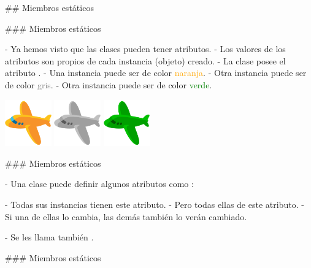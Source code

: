 ## Miembros estáticos

### Miembros estáticos


- Ya hemos visto que las clases pueden tener atributos.
    - Los valores de los atributos son propios de cada instancia (objeto) creado.
        - La clase  posee el atributo .
        - Una instancia puede ser de color \textcolor{orange}{naranja}.
        - Otra instancia puede ser de color \textcolor{gray}{gris}.
        - Otra instancia puede ser de color \textcolor{green}{verde}.

\vfill

\columnsbegin
{}
\centering\includegraphics[width=20mm]{icons/92-emoji_android_airplane.png}
\centering\includegraphics[width=20mm]{icons/92-emoji_android_airplane_gray.png}
\centering\includegraphics[width=20mm]{icons/92-emoji_android_airplane_green.png}
\columnsend

### Miembros estáticos


- Una clase puede definir algunos atributos como :

\buildrboxx[0.9\textwidth]{}

- Todas sus instancias tienen este atributo.
- Pero todas ellas  de este atributo.
    - Si una de ellas lo cambia, las demás también lo verán cambiado.

\finishrboxx

- Se les llama también .

### Miembros estáticos

